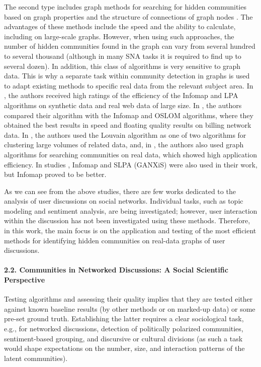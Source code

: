 The second type includes graph methods for searching for hidden communities based on graph properties \cite{CauteruccioCorradiniTerracina} and the structure of connections of graph nodes \cite{RosvallAxelssonBergstrom,BlondelGuillaumeLambiotte,RaghavanAlbertKumara}. The advantages of these methods include the speed and the ability to calculate, including on large-scale graphs. However, when using such approaches, the number of hidden communities found in the graph can vary from several hundred to several thousand (although in many SNA tasks it is required to find up to several dozen). In addition, this class of algorithms is very sensitive to graph data. This is why a separate task within community detection in graphs is used to adapt existing methods to specific real data from the relevant subject area. In \cite{AgresteDeMeoFiumara}, the authors received high ratings of the efficiency of the Infomap \cite{RosvallAxelssonBergstrom} and LPA \cite{RaghavanAlbertKumara} algorithms on synthetic data and real web data of large size. In \cite{DengZhaiLv}, the authors compared their algorithm with the Infomap and OSLOM \cite{LancichinettiRadicchiRamasco} algorithms, where they obtained the best results in speed and floating quality results on billing network data. In \cite{AmatiAngeliniCruciani}, the authors used the Louvain \cite{BlondelGuillaumeLambiotte} algorithm as one of two algorithms for clustering large volumes of related data, and, in \cite{YuLiangJieJie,MotheMkhitaryanHaroutunian}, the authors also used graph algorithms for searching communities on real data, which showed high application efficiency. In studies \cite{DeitrickHu,ChenYinLi}, Infomap and SLPA (GANXiS) \cite{XieSzymanskiLiu} were also used in their work, but Infomap proved to be better.

As we can see from the above studies, there are few works dedicated to the analysis of user discussions on social networks. Individual tasks, such as topic modeling and sentiment analysis, are being investigated; however, user interaction within the discussion has not been investigated using these methods. Therefore, in this work, the main focus is on the application and testing of the most efficient methods for identifying hidden communities on real-data graphs of user discussions.

\paragraph{2.2. Communities in Networked Discussions: A Social Scientific Perspective} Testing algorithms and assessing their quality implies that they are tested either against known baseline results (by other methods or on marked-up data) or some pre-set ground truth. Establishing the latter requires a clear sociological task, e.g., for networked discussions, detection of politically polarized communities, sentiment-based grouping, and discursive or cultural divisions (as such a task would shape expectations on the number, size, and interaction patterns of the latent communities).

